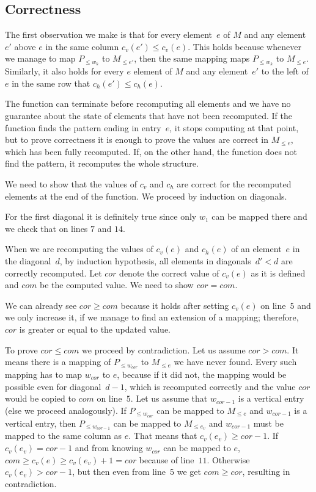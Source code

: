 \subsection{Correctness}
The first observation we make is that for every element~$e$ of $M$ and any element~$e'$ above $e$ in the same column $c_v(e')\leq c_v(e)$. This holds because whenever we manage to map $P_{\leq w_k}$ to $M_{\leq e'}$, then the same mapping maps $P_{\leq w_k}$ to $M_{\leq e}$. Similarly, it also holds for every $e$ element of $M$ and any element~$e'$ to the left of $e$ in the same row that $c_h(e')\leq c_h(e)$.

The function can terminate before recomputing all elements and we have no guarantee about the state of elements that have not been recomputed. If the function finds the pattern ending in entry~$e$, it stops computing at that point, but to prove correctness it is enough to prove the values are correct in $M_{\leq e}$, which has been fully recomputed. If, on the other hand, the function does not find the pattern, it recomputes the whole structure.

We need to show that the values of $c_v$ and $c_h$ are correct for the recomputed elements at the end of the function. We proceed by induction on diagonals.

For the first diagonal it is definitely true since only $w_1$ can be mapped there and we check that on lines $7$ and $14$.

When we are recomputing the values of $c_v(e)$ and $c_h(e)$ of an element~$e$ in the diagonal~$d$, by induction hypothesis, all elements in diagonals~$d'<d$ are correctly recomputed. Let $cor$ denote the correct value of $c_v(e)$ as it is defined and $com$ be the computed value. We need to show $cor=com$.

We can already see $cor\geq com$ because it holds after setting $c_v(e)$ on line~$5$ and we only increase it, if we manage to find an extension of a mapping; therefore, $cor$ is greater or equal to the updated value.

To prove $cor\leq com$ we proceed by contradiction. Let us assume $cor>com$. It means there is a mapping of $P_{\leq w_{cor}}$ to $M_{\leq e}$ we have never found. Every such mapping has to map $w_{cor}$ to $e$, because if it did not, the mapping would be possible even for diagonal~$d-1$, which is recomputed correctly and the value $cor$ would be copied to $com$ on line~$5$. Let us assume that $w_{cor-1}$ is a vertical entry (else we proceed analogously). If $P_{\leq w_{cor}}$ can be mapped to $M_{\leq e}$ and $w_{cor-1}$ is a vertical entry, then $P_{\leq w_{cor-1}}$ can be mapped to $M_{\leq e_v}$ and $w_{cor-1}$ must be mapped to the same column as $e$. That means that $c_v(e_v)\geq cor-1$. If $c_v(e_v)=cor-1$ and from knowing $w_{cor}$ can be mapped to $e$, $com\geq c_v(e)\geq c_v(e_v)+1=cor$ because of line~$11$. Otherwise $c_v(e_v)>cor-1$, but then even from line~$5$ we get $com\geq cor$, resulting in contradiction.

